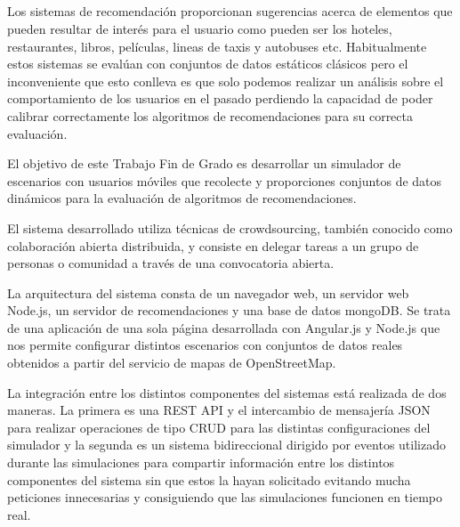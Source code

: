 \chapter*{}

\cleardoublepage
\thispagestyle{empty}

\begin{center}
{\large\bfseries \myTitle}\\
\end{center}

\vspace{0.7cm}
\\

Los sistemas de recomendación proporcionan sugerencias acerca de elementos que pueden resultar de interés para el usuario como pueden ser los hoteles, restaurantes, libros, películas, lineas de taxis y autobuses etc. Habitualmente estos sistemas se evalúan con conjuntos de datos estáticos clásicos pero el inconveniente que esto conlleva es que solo podemos realizar un análisis sobre el comportamiento de los usuarios en el pasado perdiendo la capacidad de poder calibrar correctamente los algoritmos de recomendaciones para su correcta evaluación.

El objetivo de este Trabajo Fin de Grado es desarrollar un simulador de escenarios con usuarios móviles que recolecte y proporciones conjuntos de datos dinámicos para la evaluación de algoritmos de recomendaciones. 

El sistema desarrollado utiliza técnicas de crowdsourcing, también conocido como colaboración abierta distribuida, y consiste en delegar tareas a un grupo de personas o comunidad a través de una convocatoria abierta.

La arquitectura del sistema consta de un navegador web, un servidor web Node.js, un servidor de recomendaciones y una base de datos mongoDB. Se trata de una aplicación de una sola página desarrollada con Angular.js y Node.js que nos permite configurar distintos escenarios con conjuntos de datos reales obtenidos a partir del servicio de mapas de OpenStreetMap.

La integración entre los distintos componentes del sistemas está realizada de dos maneras. La primera es una REST API y el intercambio de mensajería JSON para realizar operaciones de tipo CRUD para las distintas configuraciones del simulador y la segunda es un sistema bidireccional dirigido por eventos utilizado durante las simulaciones para compartir información entre los distintos componentes del sistema sin que estos la hayan solicitado evitando mucha peticiones innecesarias y consiguiendo que las simulaciones funcionen en tiempo real.

